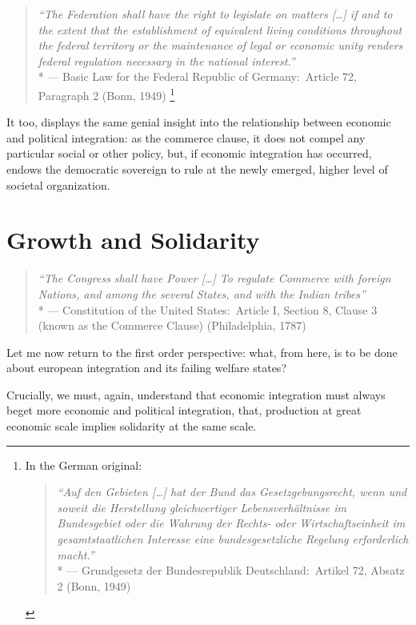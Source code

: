 \begin{quote}
	\emph{``The Federation shall have the right to legislate on matters [\ldots] if and to the extent that the establishment of equivalent living conditions throughout the federal territory or the maintenance of legal or economic unity renders federal regulation necessary in the national interest.''}
	\\*
	--- Basic Law for the Federal Republic of Germany:\ Article 72, Paragraph 2 (Bonn, 1949)
	\footnote{
		In the German original:
		\begin{quote}
			\emph{``Auf den Gebieten [\ldots] hat der Bund das Gesetzgebungsrecht, wenn und soweit die Herstellung gleichwertiger Lebensverhältnisse im Bundesgebiet oder die Wahrung der Rechts- oder Wirtschaftseinheit im gesamtstaatlichen Interesse eine bundesgesetzliche Regelung erforderlich macht.''}
			\\*
			--- Grundgesetz der Bundesrepublik Deutschland:\ Artikel 72, Absatz 2 (Bonn, 1949)
		\end{quote}
	}
\end{quote}

It too, displays the same genial insight into the relationship between economic and political integration:
as the commerce clause, it does not compel any particular social or other policy, but, if economic integration has occurred, endows the democratic sovereign to rule at the newly emerged, higher level of societal organization.

\section{Growth and Solidarity} \label{sec:growth-solidarity}

\begin{quote}
	\emph{``The Congress shall have Power [\ldots] To regulate Commerce with foreign Nations, and among the several States, and with the Indian tribes''}
	\\*
	--- Constitution of the United States:\ Article I, Section 8, Clause 3 (known as the Commerce Clause) (Philadelphia, 1787)
\end{quote}

Let me now return to the first order perspective:
what, from here, is to be done about european integration and its failing welfare states?

Crucially, we must, again, understand that economic integration must always beget more economic and political integration, that, production at great economic scale implies solidarity at the same scale.

